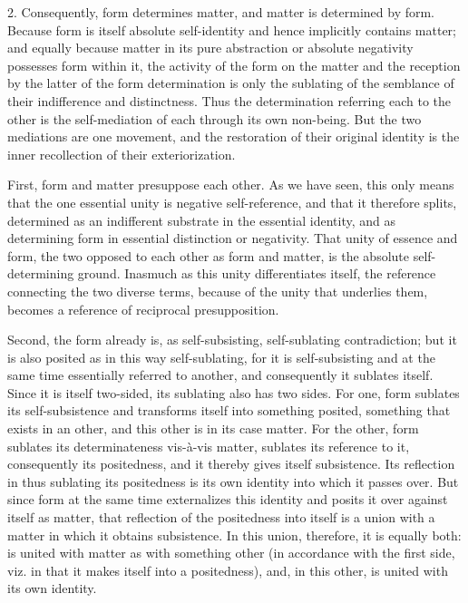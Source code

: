 2. Consequently, form determines matter,
and matter is determined by form.
Because form is itself absolute self-identity
and hence implicitly contains matter;
and equally because matter in its pure abstraction
or absolute negativity possesses form within it,
the activity of the form on the matter
and the reception by the latter of the form determination is only
the sublating of the semblance of their indifference and distinctness.
Thus the determination referring each to the other is
the self-mediation of each through its own non-being.
But the two mediations are one movement,
and the restoration of their original identity is
the inner recollection of their exteriorization.

First, form and matter presuppose each other.
As we have seen, this only means that the one essential unity is
negative self-reference, and that it therefore splits,
determined as an indifferent substrate in the essential identity,
and as determining form in essential distinction or negativity.
That unity of essence and form, the two opposed to each other as
form and matter, is the absolute self-determining ground.
Inasmuch as this unity differentiates itself,
the reference connecting the two diverse terms,
because of the unity that underlies them,
becomes a reference of reciprocal presupposition.

Second, the form already is, as self-subsisting,
self-sublating contradiction;
but it is also posited as in this way self-sublating,
for it is self-subsisting and at the same time
essentially referred to another,
and consequently it sublates itself.
Since it is itself two-sided, its sublating also has two sides.
For one, form sublates its self-subsistence
and transforms itself into something posited,
something that exists in an other,
and this other is in its case matter.
For the other, form sublates its determinateness vis-à-vis matter,
sublates its reference to it, consequently its positedness,
and it thereby gives itself subsistence.
Its reflection in thus sublating its positedness is
its own identity into which it passes over.
But since form at the same time externalizes this identity
and posits it over against itself as matter,
that reflection of the positedness into itself is
a union with a matter in which it obtains subsistence.
In this union, therefore, it is equally both:
is united with matter as with something other
(in accordance with the first side, viz. in that it makes
itself into a positedness),
and, in this other, is united with its own identity.

